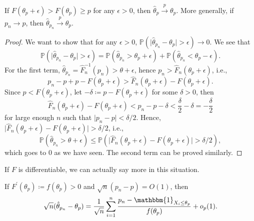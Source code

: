 \begin{theorem}
	If \(F(\theta _p + \epsilon ) > F(\theta _p) \geq p\) for any \(\epsilon > 0\), then \(\hat{\theta} _p \overset{p}{\to} \theta _p\). More generally, if \(p_n \to p\), then \(\hat{\theta} _{p_n} \overset{p}{\to} \theta _p\).
\end{theorem}
\begin{proof}
	We want to show that for any \(\epsilon > 0\), \(\mathbb{P} (\vert \hat{\theta} _{p_n} - \theta _p \vert > \epsilon ) \to 0\). We see that
	\[
		\mathbb{P} (\vert \hat{\theta} _{p_n} - \theta _p \vert > \epsilon )
		= \mathbb{P} (\hat{\theta} _{p_n} > \theta _p + \epsilon ) + \mathbb{P} (\hat{\theta} _{p_n} < \theta _p - \epsilon ).
	\]
	For the first term, \(\hat{\theta} _{p_n} = \hat{F} _n^{-1} (p_n) > \theta + \epsilon \), hence \(p_n > \hat{F} _n(\theta _p + \epsilon )\), i.e.,
	\[
		p_n - p + p  - F(\theta _p + \epsilon )
		> \hat{F} _n(\theta _p + \epsilon ) - F(\theta _p + \epsilon ).
	\]
	Since \(p < F(\theta _p + \epsilon )\), let \(- \delta \coloneqq p - F(\theta _p + \epsilon )\) for some \(\delta > 0\), then
	\[
		\hat{F} _n(\theta _p + \epsilon ) - F(\theta _p + \epsilon )
		< p_n - p - \delta
		< \frac{\delta}{2} - \delta
		= -\frac{\delta}{2}
	\]
	for large enough \(n\) such that \(\vert p_n - p \vert < \delta / 2\). Hence, \(\vert \hat{F} _n(\theta _p + \epsilon ) - F(\theta _p + \epsilon ) \vert > \delta / 2\), i.e.,
	\[
		\mathbb{P} (\hat{\theta} _{p_n} > \theta + \epsilon )
		\leq \mathbb{P} (\vert \hat{F} _n(\theta _p + \epsilon ) - F(\theta _p + \epsilon ) \vert > \delta / 2),
	\]
	which goes to \(0\) as we have seen. The second term can be proved similarly.
\end{proof}

If \(F\) is differentiable, we can actually say more in this situation.

\begin{theorem}\label{thm:Bahadur-representation}
	If \(F^{\prime} (\theta _p) \coloneqq f(\theta _p) > 0\) and \(\sqrt{n} (p_n - p) = O(1)\), then
	\[
		\sqrt{n} (\hat{\theta} _{p_n} - \theta _p)
		= \frac{1}{\sqrt{n} } \sum_{i=1}^{n} \frac{p_n - \mathbbm{1}_{X_i \leq \theta _p}}{f(\theta _p)} + o_p(1).
	\]
\end{theorem}


